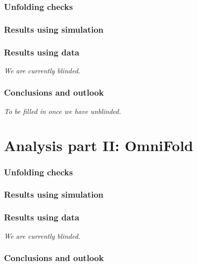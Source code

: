 \documentclass[NOTE, atlasdraft=true, texlive=2016, UKenglish]{\ATLASLATEXPATH atlasdoc}
\begin{document}
\section{Unfolding checks}


\clearpage

\section{Results using simulation}


\clearpage

\section{Results using data}

\textit{We are currently blinded.}

\section{Conclusions and outlook}

\textit{To be filled in once we have unblinded.}

\part{Analysis part II: OmniFold}
\label{part:omnifold}

\section{Unfolding checks}


\section{Results using simulation}


\section{Results using data}

\textit{We are currently blinded.}

\section{Conclusions and outlook}
\label{sec:conclusion}
\end{document}
